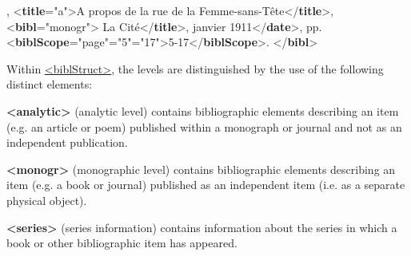 \begin{shaded}
,\mbox{}\newline 
{<\textbf{title}\hspace*{1em}{level}="{a}">}A propos de la rue de la Femme-sans-Tête{</\textbf{title}>},\mbox{}\newline 
{<\textbf{bibl}\hspace*{1em}{type}="{monogr}">}\mbox{}\newline 
\hspace*{1em}La Cité{</\textbf{title}>},\mbox{}\newline 
{}janvier 1911{</\textbf{date}>}, pp. {<\textbf{biblScope}\hspace*{1em}{unit}="{page}"\hspace*{1em}{from}="{5}"\hspace*{1em}{to}="{17}">}5-17{</\textbf{biblScope}>}.\mbox{}\newline 
{}\mbox{}\newline 
{</\textbf{bibl}>}\end{shaded}\egroup\par \par
Within \hyperref[TEI.biblStruct]{<biblStruct>}, the levels are distinguished by the use of the following distinct elements: 
\begin{sansreflist}
  
\item [\textbf{<analytic>}] (analytic level) contains bibliographic elements describing an item (e.g. an article or poem) published within a monograph or journal and not as an independent publication.
\item [\textbf{<monogr>}] (monographic level) contains bibliographic elements describing an item (e.g. a book or journal) published as an independent item (i.e. as a separate physical object).
\item [\textbf{<series>}] (series information) contains information about the series in which a book or other bibliographic item has appeared.
\end{sansreflist}
\par
